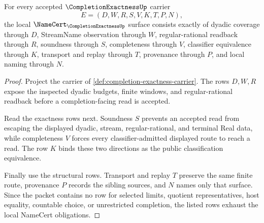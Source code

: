 \begin{theorem}
\label{thm:completion-exactness-namecert-obligations}
For every accepted $\CompletionExactnessUp$ carrier
$$
E=(D,W,R,S,V,K,T,P,N),
$$
the local $\NameCert_{\CompletionExactnessUp}$ surface consists exactly of dyadic coverage through $D$, StreamName observation through $W$, regular-rational readback through $R$, soundness through $S$, completeness through $V$, classifier equivalence through $K$, transport and replay through $T$, provenance through $P$, and local naming through $N$.
\end{theorem}
\begin{proof}
Project the carrier of \autoref{def:completion-exactness-carrier}. The rows $D,W,R$ expose the inspected dyadic budgets, finite windows, and regular-rational readback before a completion-facing read is accepted.

Read the exactness rows next. Soundness $S$ prevents an accepted read from escaping the displayed dyadic, stream, regular-rational, and terminal Real data, while completeness $V$ forces every classifier-admitted displayed route to reach a read. The row $K$ binds these two directions as the public classification equivalence.

Finally use the structural rows. Transport and replay $T$ preserve the same finite route, provenance $P$ records the sibling sources, and $N$ names only that surface. Since the packet contains no row for selected limits, quotient representatives, host equality, countable choice, or unrestricted completion, the listed rows exhaust the local NameCert obligations.
\end{proof}

